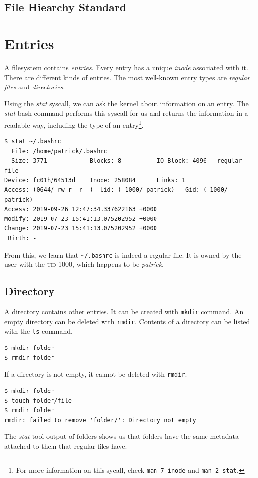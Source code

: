 \documentclass[a4paper]{article}
\begin{document}
\subsection{File Hiearchy Standard}

\section{Entries}

A filesystem contains \emph{entries}. Every entry has a unique \emph{inode} associated with it. There are different kinds of entries. The most well-known entry types are \emph{regular files} and \emph{directories}. 

Using the \emph{stat} syscall, we can ask the kernel about information on an entry. The \emph{stat} bash command performs this syscall for us and returns the information in a readable way, including the type of an entry\footnote{For more information on this sycall, check \texttt{man 7 inode} and \texttt{man 2 stat}.}.

\begin{verbatim}
$ stat ~/.bashrc
  File: /home/patrick/.bashrc
  Size: 3771            Blocks: 8          IO Block: 4096   regular file
Device: fc01h/64513d    Inode: 258084      Links: 1
Access: (0644/-rw-r--r--)  Uid: ( 1000/ patrick)   Gid: ( 1000/ patrick)
Access: 2019-09-26 12:47:34.337622163 +0000
Modify: 2019-07-23 15:41:13.075202952 +0000
Change: 2019-07-23 15:41:13.075202952 +0000
 Birth: -  
\end{verbatim}
From this, we learn that \verb|~/.bashrc| is indeed a regular file. It is owned by the user with the \textsc{uid} 1000, which happens to be \emph{patrick}. 

\subsection{Directory}

A directory contains other entries. It can be created with \verb|mkdir| command. An empty directory can be deleted with \verb|rmdir|. Contents of a directory can be listed with the \verb|ls| command.

\begin{verbatim}
$ mkdir folder
$ rmdir folder  
\end{verbatim}
If a directory is not empty, it cannot be deleted with \verb|rmdir|.

\begin{verbatim}
$ mkdir folder
$ touch folder/file
$ rmdir folder
rmdir: failed to remove 'folder/': Directory not empty
\end{verbatim}
The \emph{stat} tool output of folders shows us that folders have the same metadata attached to them that regular files have.
\end{document}
